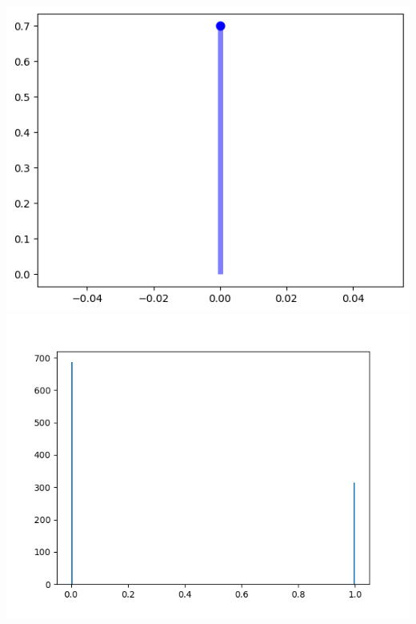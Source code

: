 \documentclass[
  letterpaper,
  DIV=11,
  numbers=noendperiod]{scrreprt}
\begin{document}
\includegraphics{figura1.png} \includegraphics{F2.png}
\end{document}
